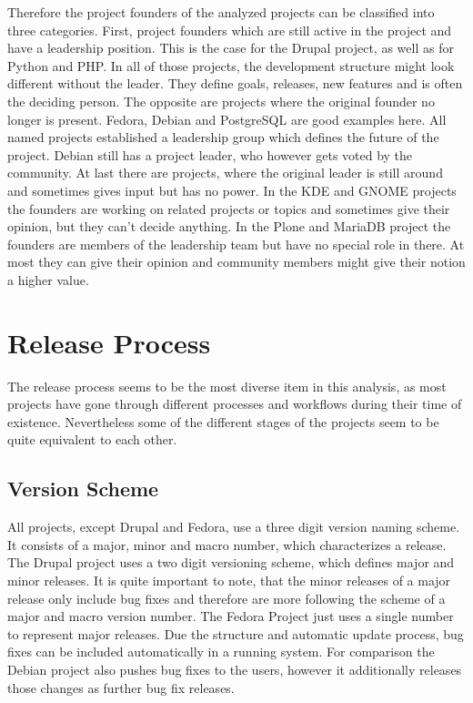 Therefore the project founders of the analyzed projects can be classified into
three categories. First, project founders which are still active in the project
and have a leadership position. This is the case for the Drupal project, as
well as for Python and PHP. In all of those projects, the development structure
might look different without the leader. They define goals, releases, new
features and is often the deciding person. The opposite are projects where the
original founder no longer is present. Fedora, Debian and PostgreSQL are good
examples here. All named projects established a leadership group which defines
the future of the project. Debian still has a project leader, who however gets
voted by the community. At last there are projects, where the original leader
is still around and sometimes gives input but has no power. In the KDE and
GNOME projects the founders are working on related projects or topics and
sometimes give their opinion, but they can't decide anything. In the Plone and
MariaDB project the founders are members of the leadership team but have no
special role in there. At most they can give their opinion and community
members might give their notion a higher value.



\section{Release Process} %

The release process seems to be the most diverse item in this analysis, as most
projects have gone through different processes and workflows during their time
of existence. Nevertheless some of the different stages of the projects seem to
be quite equivalent to each other.

\subsection{Version Scheme} %

All projects, except Drupal and Fedora, use a three digit version naming
scheme. It consists of a major, minor and macro number, which characterizes a
release. The Drupal project uses a two digit versioning scheme, which defines
major and minor releases. It is quite important to note, that the minor
releases of a major release only include bug fixes and therefore are more
following the scheme of a major and macro version number. The Fedora Project
just uses a single number to represent major releases. Due the structure and
automatic update process, bug fixes can be included automatically in a running
system. For comparison the Debian project also pushes bug fixes to the users,
however it additionally releases those changes as further bug fix releases.

